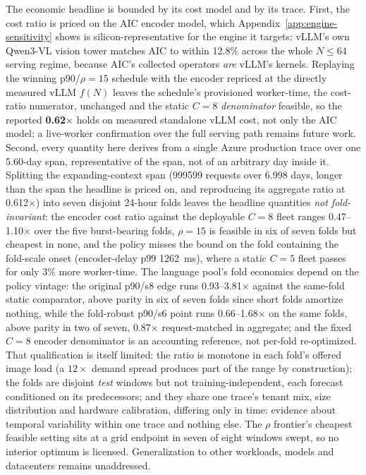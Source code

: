 The economic headline is bounded by its cost model and by its trace. First,
the cost ratio is priced on the
AIC encoder model, which Appendix~\ref{app:engine-sensitivity} shows is
silicon-representative for the engine it targets: vLLM's own Qwen3-VL vision
tower matches AIC to within 12.8\% across the whole $N\le64$ serving regime,
because AIC's collected operators \emph{are} vLLM's kernels. Replaying the
winning p90/$\rho{=}15$ schedule with the encoder repriced at the
directly measured vLLM $f(N)$ leaves the schedule's provisioned worker-time,
the cost-ratio numerator, unchanged and the static $C{=}8$
\emph{denominator} feasible, so the reported \textbf{0.62$\times$} holds on
measured standalone vLLM cost, not only the AIC model; a live-worker
confirmation over the full serving path remains future work. Second, every
quantity here derives from a single Azure production trace over one 5.60-day
span, representative of the span, not of an arbitrary day inside it. Splitting
the expanding-context span (\num{999599} requests over 6.998 days, longer than
the span the headline is priced on, and reproducing its aggregate ratio at
0.612$\times$) into seven disjoint 24-hour folds leaves the headline quantities
\emph{not fold-invariant}: the encoder cost ratio against the deployable $C{=}8$
fleet ranges 0.47--1.10$\times$ over the five burst-bearing folds, $\rho{=}15$
is feasible in six of seven folds but cheapest in none, and the policy misses
the bound on the fold containing the fold-scale onset (encoder-delay p99
\SI{1262}{\milli\second}), where a static $C{=}5$ fleet passes for only $3\%$
more worker-time. The language pool's fold economics depend on the policy
vintage: the original p90/s8 edge runs 0.93--3.81$\times$ against the same-fold
static comparator, above parity in six of seven folds since short folds
amortize nothing, while the fold-robust p90/s6 point runs 0.66--1.68$\times$
on the same folds, above
parity in two of seven, 0.87$\times$ request-matched in aggregate; and the
fixed $C{=}8$ encoder denominator is an accounting reference, not per-fold
re-optimized. That qualification is itself limited: the ratio is
monotone in each fold's offered image load (a $12\times$ demand spread produces
part of the range by construction); the folds are disjoint \emph{test} windows
but not training-independent, each forecast conditioned on its predecessors;
and they share one trace's tenant mix, size distribution and hardware
calibration, differing only in time: evidence about temporal variability
within one trace and nothing else. The $\rho$ frontier's cheapest feasible
setting sits at a grid endpoint in seven of eight windows swept, so no interior
optimum is licensed. Generalization to other workloads, models and datacenters
remains unaddressed.

